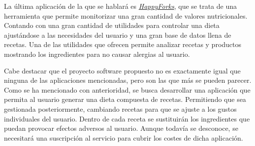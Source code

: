 La última aplicación de la que se hablará es \href{https://happyforks.com/}{\emph{HappyForks}}, que se trata de una herramienta que permite monitorizar una gran cantidad de valores nutricionales. Contando con una gran cantidad de utilidades para controlar una dieta ajustándose a las necesidades del usuario y una gran base de datos llena de recetas. Una de las utilidades que ofrecen permite analizar recetas y productos mostrando los ingredientes para no causar alergias al usuario. 

Cabe destacar que el proyecto software propuesto no es exactamente igual que ninguna de las aplicaciones mencionadas, pero son las que más se pueden parecer. Como se ha mencionado con anterioridad, se busca desarrollar una aplicación que permita al usuario generar una dieta compuesta de recetas. Permitiendo que sea gestionada posteriormente, cambiando recetas para que se ajuste a los gustos individuales del usuario. Dentro de cada receta se sustituirán los ingredientes que puedan provocar efectos adversos al usuario. Aunque todavía se desconoce, se necesitará una suscripción al servicio para cubrir los costes de dicha aplicación.